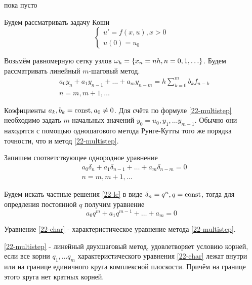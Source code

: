 \begin{col-answer-preambule}
	\begin{plan}
    \item пока пусто
	\end{plan}
\end{col-answer-preambule}


Будем рассматривать задачу Коши
\begin{equation}
  \begin{cases}
    u' = f(x, u), x > 0\\
    u(0) = u_0
  \end{cases}
\end{equation}

Возьмём равномерную сетку узлов $\omega_h = \left\{ x_n = nh, n = 0, 1, \ldots \right\}$.
Будем рассматривать линейный $m$-шаговый метод.
\begin{align}
  \label{22-multistep}
  &a_0y_n + a_1y_{n - 1} + \ldots + a_my_{n - m} = h\sum\limits_{k = 0}^mb_kf_{n-k}\\
  \nonumber
  &n = m, m + 1, \ldots
\end{align}

Коэфициенты $a_k, b_k = \operatorname{\text{const}}, a_0 \neq 0$. Для счёта по формуле \eqref{22-multistep}
необходимо задать $m$ начальных значений $y_0 = u_0, y_1, \ldots y_{m - 1}$. Обычно они
находятся с помощью одношагового метода Рунге-Кутты того же порядка точности, что и метод
\eqref{22-multistep}.

Запишем соответствующее однородное уравнение
\begin{align}
  \label{22-le}
  &a_0\delta_n + a_1\delta_{n - 1} + \ldots + a_m\delta_{n - m} = 0\\
  \nonumber
  &n = m, m + 1, \ldots
\end{align}

Будем искать частные решения \eqref{22-le} в виде $\delta_n = q^n, q = \operatorname{\text{const}}$, тогда для
опредления постоянной $q$ получим уравнение
\begin{equation}
  \label{22-char}
  a_0q^m + a_1q^{m - 1} + \ldots + a_m = 0
\end{equation}

\begin{definition}
  Уравнение \eqref{22-char} - характеристическое уравнение метода \eqref{22-multistep}.
\end{definition}

\begin{definition}
  \eqref{22-multistep} - линейный двухшаговый метод, удовлетворяет условию корней, если
  все корни $q_1, \ldots q_m$ характеристического уравнения \eqref{22-char} лежат внутри
  или на границе единичного круга комплексной плоскости. Причём на границе этого круга нет
  кратных корней.
\end{definition}

